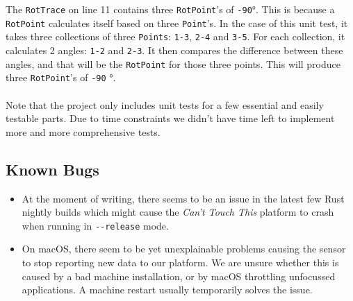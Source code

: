 \documentclass{standalone}
\begin{document}
  The \verb_RotTrace_ on line 11 contains three \verb_RotPoint_'s of \verb_-90_\si{\degree}.
  This is because a \verb_RotPoint_ calculates itself based on three
  \verb_Point_'s. In the case of this unit test, it takes three collections of
  three \verb_Points_: \verb_1-3_, \verb_2-4_ and \verb_3-5_. For each
  collection, it calculates 2 angles: \verb_1-2_ and \verb_2-3_. It then
  compares the difference between these angles, and that will be the
  \verb_RotPoint_ for those three points. This will produce three
  \verb_RotPoint_'s of \verb_-90_ \si{\degree}.

  \paragraph{}
  Note that the project only includes unit tests for a few essential and easily
  testable parts. Due to time constraints we didn't have time left to implement
  more and more comprehensive tests.

  \subsection{Known Bugs}
  \begin{itemize}
    \tightlist{}
    \item At the moment of writing, there seems to be an issue in the latest
      few Rust nightly builds which might cause the \textit{Can't Touch This}
      platform to crash when running in \verb_--release_ mode.
    \item On macOS, there seem to be yet unexplainable problems causing the sensor
      to stop reporting new data to our platform. We are unsure whether this is
      caused by a bad machine installation, or by macOS throttling unfocussed
      applications. A machine restart usually temporarily solves the issue.
  \end{itemize}

  \clearpage
\end{document}
